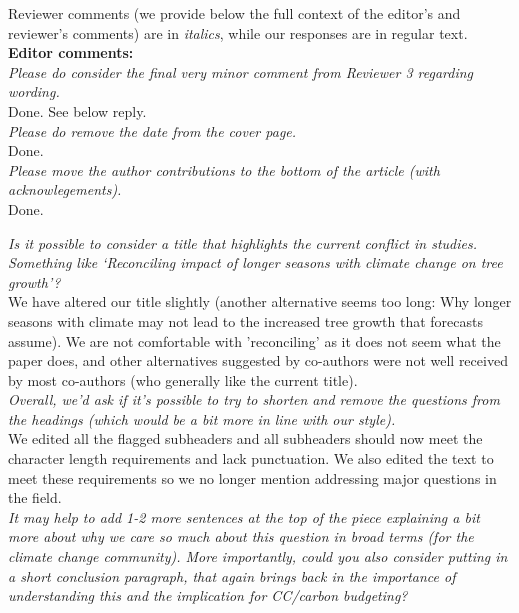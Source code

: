 \documentclass[11pt]{article}
\begin{document}
\setlength{\parindent}{0cm}
\setlength{\parskip}{7pt}


\lrenewcommand{\lrefname}{\CHead{}}

Reviewer comments (we provide below the full context of the editor's and reviewer's comments) are in \emph{italics}, while our responses are in regular text. \\ 

{\bf Editor comments:} \\

\emph{Please do consider the final very minor comment from Reviewer 3 regarding wording.}\\

Done. See below reply.\\

\emph{Please do remove the date from the cover page.}\\

Done. \\

\emph{Please move the author contributions to the bottom of the article (with acknowlegements).}\\

Done.

\emph{Is it possible to consider a title that highlights the current conflict in studies. Something like `Reconciling impact of longer seasons with climate change on tree growth'?}\\

We have altered our title slightly (another alternative seems too long: Why longer seasons with climate may not lead to the increased tree growth that forecasts assume). We are not comfortable with 'reconciling' as it does not seem what the paper does, and other alternatives suggested by co-authors were not well received by most co-authors (who generally like the current title).  \\ 

\emph{Overall, we'd ask if it's possible to try to shorten and remove the questions from the headings (which would be a bit more in line with our style).}\\

We edited all the flagged subheaders and all subheaders should now meet the character length requirements and lack punctuation. We also edited the text to meet these requirements so we no longer mention addressing major questions in the field.\\

\emph{It may help to add 1-2 more sentences at the top of the piece explaining a bit more about why we care so much about this question in broad terms (for the climate change community). More importantly, could you also consider putting in a short conclusion paragraph, that again brings back in the importance of understanding this and the implication for CC/carbon budgeting?}\\
\end{document}
